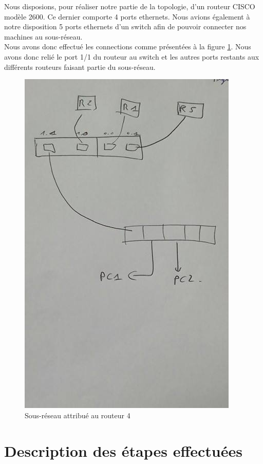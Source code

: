 \documentclass[10pt,a4paper]{article}
\begin{document}
Nous disposions, pour réaliser notre partie de la topologie, d'un routeur CISCO modèle 2600. Ce dernier comporte 4 ports ethernets. Nous avions également à notre disposition 5 ports ethernets d'un switch afin de pouvoir connecter nos machines au sous-réseau.\\
Nous avons donc effectué les connections comme présentées à la figure \ref{topoint}. Nous avons donc relié le port 1/1 du routeur au switch et les autres ports restants aux différents routeurs faisant partie du sous-réseau.  

\begin{figure}[h]
\begin{center}
\includegraphics[scale=0.2]{tmp.jpg}
\caption{Sous-réseau attribué au routeur 4}
\label{topoint}
\end{center}
\end{figure}

\section{Description des étapes effectuées}
\end{document}
